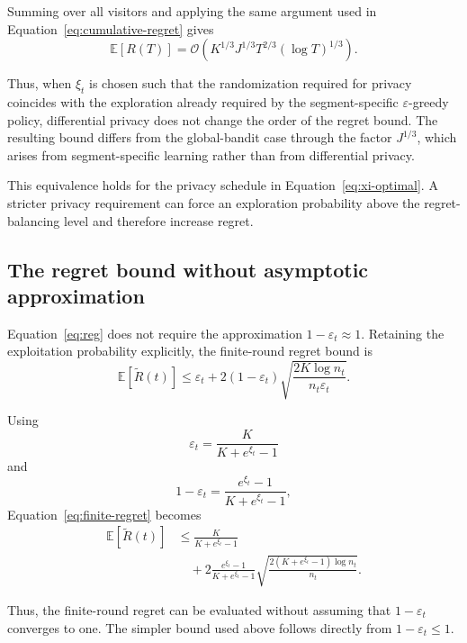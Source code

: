 \documentclass[mksc,nonblindrev]{informs3}
\begin{document}
\begin{APPENDICES}
Summing over all visitors and applying the same argument used in
Equation~\eqref{eq:cumulative-regret} gives
\begin{equation}
\label{eq:cumulative-private-regret}
\mathbb E[R(T)]
=
\mathcal O\left(
K^{1/3}
J^{1/3}
T^{2/3}
(\log T)^{1/3}
\right).
\end{equation}

Thus, when $\xi_t$ is chosen such that the randomization required for privacy coincides with the exploration already required by the segment-specific $\varepsilon$-greedy policy, differential privacy does not change the order of the regret bound. The resulting bound differs from the global-bandit case through the factor $J^{1/3}$, which arises from segment-specific learning rather than from differential privacy.

This equivalence holds for the privacy schedule in Equation~\eqref{eq:xi-optimal}. A stricter privacy requirement can force an exploration probability above the regret-balancing level and therefore
increase regret.

\subsection{The regret bound without asymptotic approximation}

Equation~\eqref{eq:reg} does not require the approximation
$1-\varepsilon_t\approx1$. Retaining the exploitation probability explicitly,
the finite-round regret bound is
\begin{equation}
\label{eq:finite-regret}
\mathbb E[\widetilde R(t)]
\leq
\varepsilon_t
+
2(1-\varepsilon_t)
\sqrt{
\frac{2K\log n_t}
{n_t\varepsilon_t}
}.
\end{equation}

Using
\[
\varepsilon_t
=
\frac{K}{K+e^{\xi_t}-1}
\]
and
\[
1-\varepsilon_t
=
\frac{e^{\xi_t}-1}
{K+e^{\xi_t}-1},
\]
Equation~\eqref{eq:finite-regret} becomes
\begin{align}
\mathbb E[\widetilde R(t)]
&\leq
\frac{K}
{K+e^{\xi_t}-1}
\nonumber\\
&\quad+
2
\frac{e^{\xi_t}-1}
{K+e^{\xi_t}-1}
\sqrt{
\frac{
2(K+e^{\xi_t}-1)\log n_t
}{
n_t
}
}.
\label{eq:finite-private-regret}
\end{align}

Thus, the finite-round regret can be evaluated without assuming that
$1-\varepsilon_t$ converges to one. The simpler bound used above follows
directly from $1-\varepsilon_t\leq1$.


\end{APPENDICES}
\end{document}

